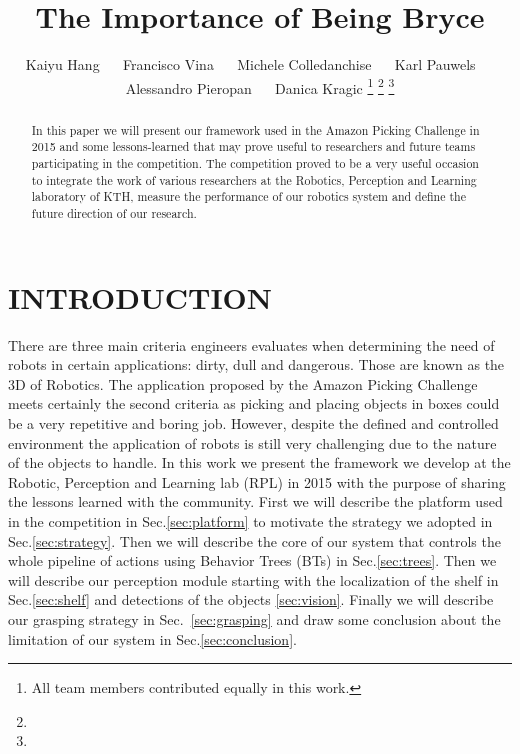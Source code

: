 \documentclass[letterpaper, 10pt, conference]{ieeeconf}
\title{\LARGE \bf The Importance of Being Bryce}
\author{Kaiyu Hang ~~ Francisco Vina ~~ Michele Colledanchise ~~ Karl Pauwels ~~ Alessandro Pieropan ~~ Danica Kragic%
\thanks{All team members contributed equally in this work.}%
\thanks{}
\thanks{}}
\begin{document}
                                                                
                                                                                
\maketitle                                                                      
\thispagestyle{empty}                                                           
\pagestyle{empty}



\begin{abstract}

In this paper we will present our framework used in the Amazon Picking Challenge in 2015 and some lessons-learned that may prove useful to researchers and future teams participating in the competition. The competition proved to be a very useful occasion to integrate the work of various researchers at the Robotics, Perception and Learning laboratory of KTH, measure the performance of our robotics system and define the future direction of our research.

\end{abstract}

\section{INTRODUCTION}
\label{sec:introduction}

There are three main criteria engineers evaluates when determining the need of robots in certain applications: dirty, dull and dangerous. Those are known as the 3D of Robotics. The application proposed by the Amazon Picking Challenge meets certainly the second criteria as picking and placing objects in boxes could be a very repetitive and boring job. However, despite the defined and controlled environment the application of robots is still very challenging due to the nature of the objects to handle.
In this work we present the framework we develop at the Robotic, Perception and Learning lab (RPL) in 2015 with the purpose of sharing the lessons learned with the community.
First we will describe the platform used in the competition in Sec.\ref{sec:platform} to motivate the strategy we adopted in Sec.\ref{sec:strategy}. Then we will describe the core of our system that controls the whole pipeline of actions using Behavior Trees (BTs) in Sec.\ref{sec:trees}. Then we will describe our perception module starting with the localization of the shelf in Sec.\ref{sec:shelf} and detections of the objects \ref{sec:vision}. Finally we will describe our grasping strategy in Sec.~\ref{sec:grasping} and draw some conclusion about the limitation of our system in Sec.\ref{sec:conclusion}.
\end{document}
